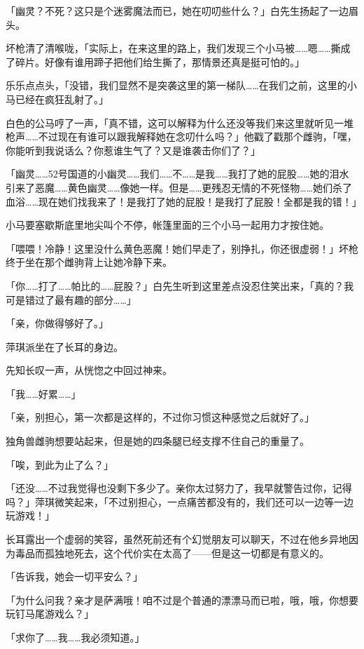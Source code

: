 「幽灵？不死？这只是个迷雾魔法而已，她在叨叨些什么？」白先生扬起了一边眉头。

坏枪清了清喉咙，「实际上，在来这里的路上，我们发现三个小马被……嗯……撕成了碎片。好像有谁用蹄子把他们给生撕了，那情景还真是挺可怕的。」

乐乐点点头，「没错，我们显然不是突袭这里的第一梯队……在我们之前，这里的小马已经在疯狂乱射了。」

白色的公马哼了一声，「真不错，这可以解释为什么还没等我们来这里就听见一堆枪声……不过现在有谁可以跟我解释她在念叨什么吗？」他戳了戳那个雌驹，「嘿，你能听到我说话么？你惹谁生气了？又是谁袭击你们了？」

「幽灵……52号国道的小幽灵……我们……不……是我……我打了她的屁股……她的泪水引来了恶魔……黄色幽灵……像她一样。但是……更残忍无情的不死怪物……她们杀了血浴……现在她们找我来了！是我打了她的屁股！是我打了屁股！全都是我的错！」

小马要塞歇斯底里地尖叫个不停，帐篷里面的三个小马一起用力才按住她。

「喂喂！冷静！这里没什么黄色恶魔！她们早走了，别挣扎，你还很虚弱！」坏枪终于坐在那个雌驹背上让她冷静下来。

「你……打了……帕比的……屁股？」白先生听到这里差点没忍住笑出来，「真的？我可是错过了最有趣的部分……」

\horizonline


「亲，你做得够好了。」

萍琪派坐在了长耳的身边。

先知长叹一声，从恍惚之中回过神来。

「我……好累……」

「亲，别担心，第一次都是这样的，不过你习惯这种感觉之后就好了。」

独角兽雌驹想要站起来，但是她的四条腿已经支撑不住自己的重量了。

「唉，到此为止了么？」

「还没……不过我觉得也没剩下多少了。亲你太过努力了，我早就警告过你，记得吗？」萍琪微笑起来，「不过别担心，一点痛苦都没有的，我们还可以一边等一边玩游戏！」

长耳露出一个虚弱的笑容，虽然死前还有个幻觉朋友可以聊天，不过在他乡异地因为毒品而孤独地死去，这个代价实在太高了——但是这一切都是有意义的。

「告诉我，她会一切平安么？」

「为什么问我？亲才是萨满哦！咱不过是个普通的漂漂马而已啦，哦，哦，你想要玩钉马尾游戏么？」

「求你了……我……我必须知道。」

